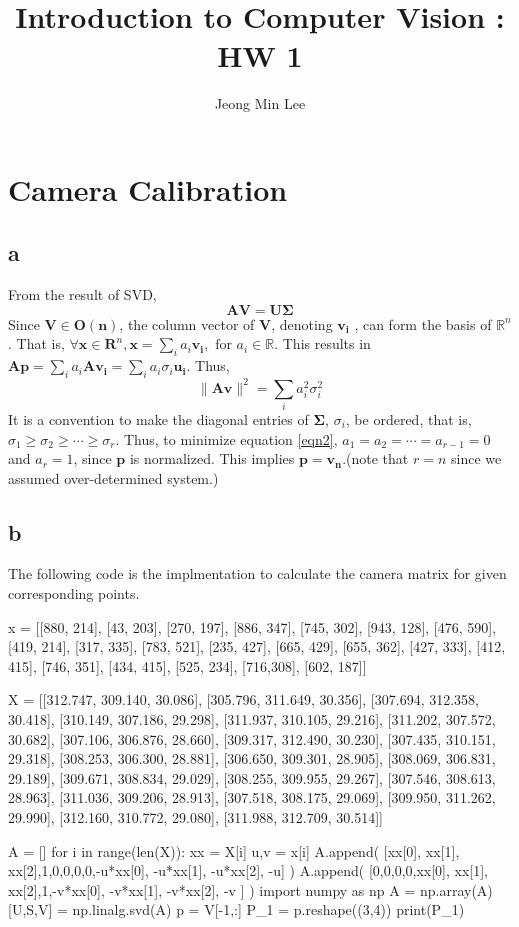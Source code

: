 \documentclass[10pt]{article}
\title{\textbf{Introduction to Computer Vision : HW 1}}
\author{Jeong Min Lee}
\begin{document}
\maketitle

\section{Camera Calibration}
\subsection*{a}
From the result of SVD, 
\begin{equation}
    \mathbf{AV=U\Sigma}
\end{equation}
Since $\mathbf{V \in O(n)}$, the column vector of $\mathbf{V}$, denoting $\mathbf{v_i}$ , can form the basis of $\mathbb{R}^n$. That is, $\forall \mathbf{x} \in \mathbf{R}^n, \mathbf{x} = \sum_i a_i \mathbf{v_i},\text{ for } a_i \in \mathbb{R}$.
This results in $\mathbf{Ap} =\sum_i a_i \mathbf{Av_i} = \sum_i a_i\sigma_i \mathbf{u_i}$. Thus,
\begin{equation}
    \lVert \mathbf{Av}\rVert^2 = \sum_i a_i^2\sigma_i^2
    \label{eqn2}
\end{equation}
It is a convention to make the diagonal entries of $\mathbf{\Sigma}$, $\sigma_i$, be ordered, that is, $\sigma_1 \ge \sigma_2 \ge \cdots \ge \sigma_r$.
Thus, to minimize equation \ref{eqn2}, $a_1 = a_2 = \cdots = a_{r-1} = 0$ and $a_r = 1$, since $\mathbf{p}$ is normalized. This implies $\mathbf{p = v_n}$.(note that $r = n$ since we assumed over-determined system.)

\subsection*{b} 
The following code is the implmentation to calculate the camera matrix for given corresponding points.
\begin{python}
x = [[880, 214],
[43, 203],
[270, 197],
[886, 347],
[745, 302],
[943, 128],
[476, 590],
[419, 214],
[317, 335],
[783, 521],
[235, 427],
[665, 429],
[655, 362],
[427, 333],
[412, 415],
[746, 351],
[434, 415],
[525, 234],
[716,308],
[602, 187]]

X = [[312.747, 309.140, 30.086],
[305.796, 311.649, 30.356],
[307.694, 312.358, 30.418],
[310.149, 307.186, 29.298],
[311.937, 310.105, 29.216],
[311.202, 307.572, 30.682],
[307.106, 306.876, 28.660],
[309.317, 312.490, 30.230],
[307.435, 310.151, 29.318],
[308.253, 306.300, 28.881],
[306.650, 309.301, 28.905],
[308.069, 306.831, 29.189],
[309.671, 308.834, 29.029],
[308.255, 309.955, 29.267],
[307.546, 308.613, 28.963],
[311.036, 309.206, 28.913],
[307.518, 308.175, 29.069],
[309.950, 311.262, 29.990],
[312.160, 310.772, 29.080],
[311.988, 312.709, 30.514]]


A = []
for i in range(len(X)):
    xx = X[i]
    u,v = x[i]
    A.append(
        [xx[0], xx[1], xx[2],1,0,0,0,0,-u*xx[0], -u*xx[1], -u*xx[2], -u]
    )
    A.append(
        [0,0,0,0,xx[0], xx[1], xx[2],1,-v*xx[0], -v*xx[1], -v*xx[2], -v ]
    )
import numpy as np
A = np.array(A)
[U,S,V] = np.linalg.svd(A)
p = V[-1,:]
P_1 = p.reshape((3,4))
print(P_1)

\end{python}
\end{document}
